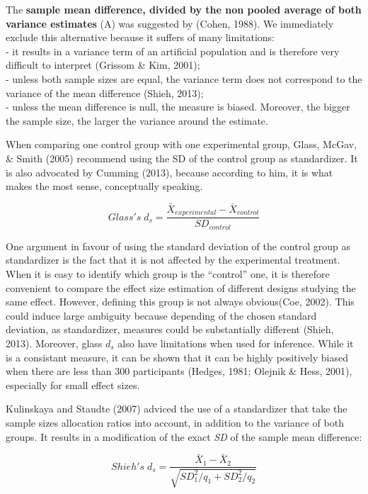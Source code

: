 \documentclass[
  man]{apa6}
\begin{document}
The \textbf{sample mean difference, divided by the non pooled average of both variance estimates} (A) was suggested by (Cohen, 1988). We immediately exclude this alternative because it suffers of many limitations:\\
- it results in a variance term of an artificial population and is therefore very difficult to interpret (Grissom \& Kim, 2001);\\
- unless both sample sizes are equal, the variance term does not correspond to the variance of the mean difference (Shieh, 2013);\\
- unless the mean difference is null, the measure is biased. Moreover, the bigger the sample size, the larger the variance around the estimate.

When comparing one control group with one experimental group, Glass, McGav, \& Smith (2005) recommend using the SD of the control group as standardizer. It is also advocated by Cumming (2013), because according to him, it is what makes the most sense, conceptually speaking.

\begin{equation} 
Glass's \; d_s = \frac{\bar{X}_{experimental} - \bar{X}_{control}}{SD_{control}}
\label{eq:Glassds}
\end{equation}

One argument in favour of using the standard deviation of the control group as standardizer is the fact that it is not affected by the experimental treatment. When it is easy to identify which group is the \enquote{control} one, it is therefore convenient to compare the effect size estimation of different designs studying the same effect. However, defining this group is not always obvious(Coe, 2002). This could induce large ambiguity because depending of the chosen standard deviation, as standardizer, measures could be substantially diﬀerent (Shieh, 2013). Moreover, glass \(d_s\) also have limitations when used for inference. While it is a consistant measure, it can be shown that it can be highly positively biased when there are less than 300 participants (Hedges, 1981; Olejnik \& Hess, 2001), especially for small effect sizes.

Kulinskaya and Staudte (2007) adviced the use of a standardizer that take the sample sizes allocation ratios into account, in addition to the variance of both groups. It results in a modification of the exact \emph{SD} of the sample mean difference:

\begin{equation} 
Shieh's \; d_s = \frac{\bar{X}_1 - \bar{X}_2}{\sqrt{SD_1^2/q_1+SD_2^2/q_2}}
\label{eq:Shiehds}
\end{equation}
\end{document}
